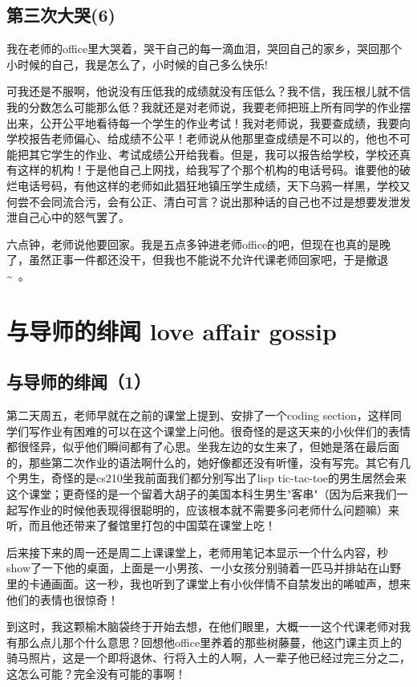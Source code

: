 \documentclass[12pt]{book}
\begin{document}
\section{第三次大哭(6)}
\label{sec-43-6}

我在老师的office里大哭着，哭干自己的每一滴血泪，哭回自己的家乡，哭回那个小时候的自己，我是怎么了，小时候的自己多么快乐!

可我还是不服啊，他说没有压低我的成绩就没有压低么？我不信，我压根儿就不信我的分数怎么可能那么低？我就还是对老师说，我要老师把班上所有同学的作业摆出来，公开公平地看待每一个学生的作业考试！我对老师说，我要查成绩，我要向学校报告老师偏心、给成绩不公平！老师说从他那里查成绩是不可以的，他也不可能把其它学生的作业、考试成绩公开给我看。但是，我可以报告给学校，学校还真有这样的机构！于是他自己上网找，给我写了个那个机构的电话号码。谁要他的破烂电话号码，有他这样的老师如此猖狂地镇压学生成绩，天下乌鸦一样黑，学校又何尝不会同流合污，会有公正、清白可言？说出那种话的自己也不过是想要发泄发泄自己心中的怒气罢了。

六点钟，老师说他要回家。我是五点多钟进老师office的吧，但现在也真的是晚了，虽然正事一件都还没干，但我也不能说不允许代课老师回家吧，于是撤退\textasciitilde{}~。
\chapter{与导师的绯闻 love affair gossip}
\label{sec-44}
\section{与导师的绯闻（1）}
\label{sec-44-1}

第二天周五，老师早就在之前的课堂上提到、安排了一个coding section，这样同学们写作业有困难的可以在这个课堂上问他。很奇怪的是这天来的小伙伴们的表情都很怪异，似乎他们瞬间都有了心思。坐我左边的女生来了，但她是落在最后面的，那些第二次作业的语法啊什么的，她好像都还没有听懂，没有写完。其它有几个男生，奇怪的是cs210坐我前面我们都分别写出了lisp tic-tac-toe的男生居然会来这个课堂；更奇怪的是一个留着大胡子的美国本科生男生"客串"（因为后来我们一起写作业的时候他表现得很聪明的，应该根本就不需要多问老师什么问题嘛）来听，而且他还带来了餐馆里打包的中国菜在课堂上吃！

后来接下来的周一还是周二上课课堂上，老师用笔记本显示一个什么内容，秒show了一下他的桌面，上面是一小男孩、一小女孩分别骑着一匹马并排站在山野里的卡通画面。这一秒，我也听到了课堂上有小伙伴情不自禁发出的唏嘘声，想来他们的表情也很惊奇！

到这时，我这颗榆木脑袋终于开始去想，在他们眼里，大概一一这个代课老师对我有那么点儿那个什么意思？回想他office里养着的那些树藤蔓，他这门课主页上的骑马照片，这是一个即将退休、行将入土的人啊，人一辈子他已经过完三分之二，这怎么可能？完全没有可能的事啊！
\end{document}
